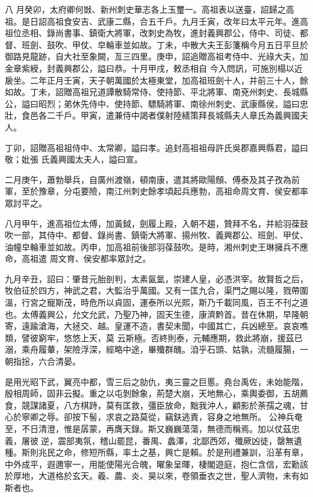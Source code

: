 \begin{pinyinscope}
 八
 月癸卯，太府卿何敱、新州刺史華志各上玉璽一。高祖表以送臺，詔歸之高祖。是日詔高祖食安吉、武康二縣，合五千戶。九月壬寅，改年曰太平元年。進高祖位丞相、錄尚書事、鎮衛大將軍，改刺史為牧，進封義興郡公，侍中、司徒、都督、班劍、鼓吹、甲仗、皁輪車並如故。丁未，中散大夫王彭箋稱今月五日平旦於御路見龍跡，自大社至象闕，亙三四里。庚申，詔追贈高祖考侍中、光祿大夫，加金章紫綬，封義興郡公，謚曰恭。十月甲戌，敕丞相自
 今入問訊，可施別榻以近扆坐。二年正月壬寅，天子朝萬國於太極東堂，加高祖班劍十人，并前三十人，餘如故。丁未，詔贈高祖兄道譚散騎常侍、使持節、平北將軍、南兗州刺史、長城縣公，謚曰昭烈；弟休先侍中、使持節、驃騎將軍、南徐州刺史、武康縣侯，謚曰忠壯，食邑各二千戶。甲寅，遣兼侍中謁者僕射陸繕策拜長城縣夫人章氏為義興國夫人。



 丁卯，詔贈高祖祖侍中、太常卿，謚曰孝。追封高祖祖母許氏吳郡嘉興縣君，謚曰敬；妣張
 氏義興國太夫人，謚曰宣。



 二月庚午，蕭勃舉兵，自廣州渡嶺，頓南康，遣其將歐陽頠、傅泰及其子孜為前軍，至於豫章，分屯要險，南江州刺史餘孝頃起兵應勃，高祖命周文育、侯安都率眾討平之。



 八月甲午，進高祖位太傅，加黃鉞，劍履上殿，入朝不趨，贊拜不名，并給羽葆鼓吹一部，其侍中、都督、錄尚書、鎮衛大將軍、揚州牧、義興郡公、班劍、甲仗、油幢皁輪車並如故。丙申，加高祖前後部羽葆鼓吹。是時，湘州刺史王琳擁兵不應命，高祖遣
 周文育、侯安都率眾討之。



 九月辛丑，詔曰：肇昔元胎剖判，太素氤氳，崇建人皇，必憑洪宰。故賢哲之后，牧伯征於四方，神武之君，大監治乎萬國。又有一匡九合，渠門之賜以隆，戮帶圍溫，行宮之寵斯茂，時危所以貞固，運泰所以光熙，斯乃千載同風，百王不刊之道也。太傅義興公，允文允武，乃聖乃神，固天生德，康濟黔首。昔在休期，早隆朝寄，遠踰滄海，大拯交、越。皇運不造，書契未聞，中國其亡，兵凶總至。哀哀噍類，譬彼窮牢，悠悠上天，莫
 云斯極。否終則泰，元輔應期，救此將崩，援茲已溺，乘舟履輂，架險浮深，經略中途，畢殲群醜。洎乎石頭、姑孰，流髓履腸，一朝指捴，六合清晏。



 是用光昭下武，翼亮中都，雪三后之勍仇，夷三靈之巨慝。堯台禹佐，未始能階，殷相周師，固非云擬。重之以屯剝餘象，荊楚大崩，天地無心，乘輿委御，五胡薦食，競謀諸夏，八方棋跱，莫有匡救，彊臣放命，黜我沖人，顧影於荼孺之魂，甘心於寧卿之辱。卻按下髻，求哀之路莫從，竊鈇逃責，容身之地無所。
 公神兵奄至，不日清澄，惟是孱蒙，再膺天錄。斯又巍巍蕩蕩，無德而稱焉。加以仗茲忠義，屠彼逆，震部夷氛，稽山罷昆，番禺、蠡澤，北鄙西郊，殲厥凶徒，罄無遺種。斯則兆民之命，修短所縣，率土之基，興亡是賴。於是刑禮兼訓，沿革有章，中外成平，遐邇寧一，用能使陽光合魄，曜象呈暉，棲閣遊庭，抱仁含信，宏勳該於厚地，大道格於玄天。羲、農、炎、昊以來，卷領垂衣之世，聖人濟物，未有如斯者也。




\end{pinyinscope}
